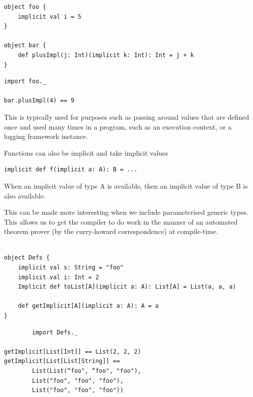 \documentclass[12pt,a4paper,twoside,openright]{report}
\renewcommand{\baselinestretch}{1.1}    %
\begin{document}
\renewcommand{\baselinestretch}{0.8}
\begin{framed}
\begin{framed}
\begin{verbatim}
object foo {
    implicit val i = 5
}

object bar {
    def plusImpl(j: Int)(implicit k: Int): Int = j + k
}
\end{verbatim}
\end{framed}

\begin{framed}
\begin{verbatim}
import foo._

bar.plusImpl(4) == 9
\end{verbatim}
\end{framed}
\end{framed}
\renewcommand{\baselinestretch}{1.1}

This is typically used for purposes such as passing around values that are defined once and used many times in a program, such as an execution context, or a logging framework instance.

Functions can also be implicit and take implicit values
\begin{framed}
\begin{verbatim}
implicit def f(implicit a: A): B = ...
\end{verbatim}
When an implicit value of type A is available, then an implicit value of type B is also available.
\end{framed}

This can be made more interesting when we include parameterised generic types. This allows us to get the compiler to do work in the manner of an automated theorem prover (by the curry-howard correspondence) at compile-time.

\renewcommand{\baselinestretch}{0.8}
\begin{framed}
	\begin{framed}
		\begin{verbatim}
		
object Defs {
    implicit val s: String = "foo"
    implicit val i: Int = 2
    Implicit def toList[A](implicit a: A): List[A] = List(a, a, a)

    def getImplicit[A](implicit a: A): A = a
}
		\end{verbatim}
	\end{framed}
	\begin{framed}
		\begin{verbatim}
		import Defs._

getImplicit[List[Int]] == List(2, 2, 2)
getImplicit[List[List[String]] == 
        List(List(“foo", “foo", "foo"),
        List("foo", "foo", "foo"), 
        List("foo", "foo", "foo"))
		\end{verbatim}
	\end{framed}
\end{framed}
\renewcommand{\baselinestretch}{1.1}
\end{document}
